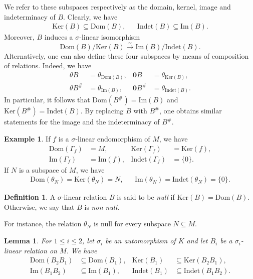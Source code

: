 \documentclass[12pt]{amsart}
\newtheorem{lemma}[theorem]{Lemma}
\theoremstyle{definition}
\newtheorem{definition}[theorem]{Definition}
\newtheorem{example}[theorem]{Example}
\newcommand{\<}{\langle}   %
\renewcommand{\>}{\rangle} %
\begin{document}
We refer to these subspaces respectively as the domain, kernel, image and indeterminacy of $B$. Clearly, we have 
\begin{align*}
    \mathrm{Ker}(B) \subseteq  \mathrm{Dom}(B), & & \mathrm{Indet}(B) \subseteq  \mathrm{Im}(B).
\end{align*}
Moreover, $B$ induces a $\sigma$-linear isomorphism 
\begin{equation*}
    \mathrm{Dom}(B)/\mathrm{Ker}(B) \xrightarrow{\sim} \mathrm{Im}(B)/\mathrm{Indet}(B).
\end{equation*}
Alternatively, one can also define these four subspaces by means of composition of relations. Indeed, we have 
\begin{align*}
    \theta B & = \theta_{\mathrm{Dom}(B)}, & \mathbf{0}B & = \theta_{\mathrm{Ker}(B)},\\
    \theta B^{\#} & = \theta_{\mathrm{Im}(B)}, & \mathbf{0}B^{\#} & = \theta_{\mathrm{Indet}(B)}.
\end{align*}
In particular, it follows that $\mathrm{Dom}(B^{\#}) = \mathrm{Im}(B)$ and $\mathrm{Ker}(B^{\#}) = \mathrm{Indet}(B)$. By replacing $B$ with $B^{\#}$, one obtains similar statements for the image and the indeterminacy of $B^{\#}$. 

\begin{example}
    If $f$ is a $\sigma$-linear endomorphism of $M$, we have 
    \begin{align*}
        \mathrm{Dom}(\Gamma_f) &= M, & \mathrm{Ker}(\Gamma_f) &= \mathrm{Ker}(f),\\
        \mathrm{Im}(\Gamma_f) &= \mathrm{Im}(f), & \mathrm{Indet}(\Gamma_f) &= \{0\}.
    \end{align*}
    If $N$ is a subspace of $M$, we have 
    \begin{align*}
        \mathrm{Dom}(\theta_N) = \mathrm{Ker}(\theta_N) = N, & & \mathrm{Im}(\theta_N) = \mathrm{Indet}(\theta_N) = \{0\}.
    \end{align*}
\end{example}

\begin{definition}\label{DefNonNull}
    A $\sigma$-linear relation $B$ is said to be \textit{null} if $\mathrm{Ker}(B) = \mathrm{Dom}(B)$. Otherwise, we say that $B$ is \textit{non-null}. 
\end{definition}

For instance, the relation $\theta_N$ is null for every subspace $N \subseteq  M$.

\begin{lemma}\label{UsefulLemma}
    For $1 \leq i \leq 2$, let $\sigma_i$ be an automorphism of $K$ and let $B_i$ be a $\sigma_i$-linear relation on $M$. We have 
    \begin{align*}
    \mathrm{Dom}(B_2B_1) & \subseteq  \mathrm{Dom}(B_1), & \mathrm{Ker}(B_1) & \subseteq  \mathrm{Ker}(B_2B_1),\\
    \mathrm{Im}(B_1B_2) & \subseteq  \mathrm{Im}(B_1), & \mathrm{Indet}(B_1) & \subseteq  \mathrm{Indet}(B_1B_2).\\
\end{align*}
\end{lemma}
\end{document}

